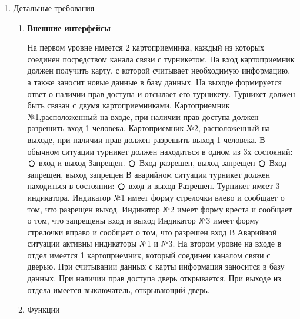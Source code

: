 \documentclass[12pt]{article} %
\def\circmark{\mathbin{\scalerel*{\circ}{j}}}
\begin{document}
\begin{enumerate}
\begin{enumerate}
  	\end{enumerate}
  \item Детальные требования
  	\begin{enumerate}
  		\item \begin{large} \textbf{Внешние интерфейсы} \end{large} \newline
  		  На первом уровне имеется 2 картоприемника, каждый из которых соединен посредством канала связи с турникетом.
  		  На вход картоприемник должен получить карту, с которой считывает необходимую информацию, а также заносит новые данные в базу данных. На выходе формируется ответ о наличии прав доступа и отсылает его турникету. Турникет должен быть связан с двумя картоприемниками. Картоприемник №1,расположенный на входе, при наличии прав доступа должен разрешить вход 1 человека. Картоприемник №2, расположенный на выходе, при наличии прав должен разрешить выход 1 человека.
  		     В обычном ситуации турникет должен находиться в одном из 3х состояний: \newline
    		  $\circmark $  вход и выход Запрещен. \newline
    		  $\circmark $ Вход разрешен, выход запрещен\newline
  	    	  $\circmark $ Вход запрещен, выход запрещен\newline
  		     В аварийном ситуации турникет должен находиться в состоянии:
  		      $\circmark $  вход и выход Разрешен. \newline
  		  Турникет имеет 3 индикатора. 
  		  Индикатор №1 имеет форму стрелочки влево и сообщает о том, что разрещен выход.
  		  Индикатор №2 имеет форму креста и сообщает о том, что запрещены вход и выход
  		  Индикатор №3 имеет форму стрелочки вправо и сообщает о том, что разрешен вход
  		  В Аварийной ситуации активны индикаторы №1 и №3.
  		  На втором уровне на входе в отдел имеется 1 картоприемник, который соединен каналом связи с дверью. При считывании данных с карты информация заносится в базу данных. При наличии прав доступа дверь открывается. При выходе из отдела имеется выключатель, открывающий дверь.  
  		\item Функции
  		   

\end{enumerate}
\end{enumerate}
\end{document}
